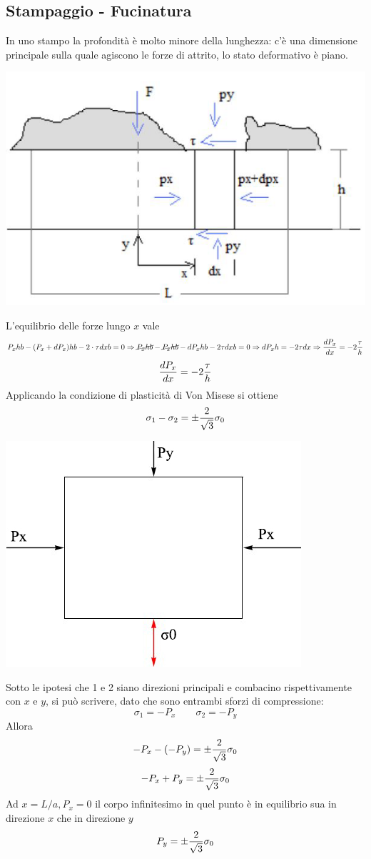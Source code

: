 \documentclass[a4paper, 15pt]{article}
\begin{document}
 	\subsection{Stampaggio - Fucinatura}
 	In uno stampo la profondità è molto minore della lunghezza: c'è una dimensione principale sulla quale agiscono le forze di attrito, lo stato deformativo è piano. 
\begin{center}
	\includegraphics[width=0.5\linewidth]{figures/def3}
\end{center}
	 L'equilibrio delle forze lungo $x$ vale
	 \[P_xhb - (P_x+dP_x)hb - 2\cdot\tau dxb = 0 \Rightarrow \cancel{P_xhb} - \cancel{P_xhb} - dP_xhb - 2\tau dxb = 0 \Rightarrow dP_xh = -2\tau dx \Rightarrow \dfrac{dP_x}{dx} = -2{\tau\over h} \]
	 \begin{equation}\label{eq:5}
	 	\dfrac{dP_x}{dx} = -2{\tau\over h}
	 \end{equation}
	 Applicando la condizione di plasticità di Von Misese si ottiene
	 \[\sigma_1-\sigma_2 = \pm{2\over\sqrt{3}}\sigma_0\]
\begin{center}
	\includegraphics[width=0.5\linewidth]{figures/def4.0}
\end{center}	 
	 Sotto le ipotesi che 1 e 2 siano direzioni principali e combacino rispettivamente con $x$ e $y$, si può scrivere, dato che sono entrambi sforzi di compressione:
	 \[\sigma_1 = -P_x\qquad\sigma_2=-P_y\]
	 Allora
	\[-P_x-(-P_y) = \pm{2\over\sqrt{3}}\sigma_0\]
	\[-P_x+P_y = \pm{2\over\sqrt{3}}\sigma_0\]
	Ad $x = L/a, P_x = 0$ il corpo infinitesimo in quel punto è in equilibrio sua in direzione $x$ che in direzione $y$ 
	\[P_y = \pm{2\over\sqrt{3}}\sigma_0\]
\end{document}
